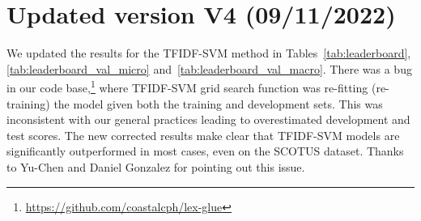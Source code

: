 \documentclass[11pt]{article}
\begin{document}
\section{Updated version V4 (09/11/2022)}

We updated the results for the TFIDF-SVM method in Tables~\ref{tab:leaderboard}, \ref{tab:leaderboard_val_micro} and~\ref{tab:leaderboard_val_macro}. There was a bug in our code base,\footnote{\url{https://github.com/coastalcph/lex-glue}} where TFIDF-SVM grid search function was re-fitting (re-training) the model given both the training and development sets. This was inconsistent with our general practices leading to overestimated development and test scores. The new corrected results make clear that TFIDF-SVM models are significantly outperformed in most cases, even on the SCOTUS dataset. Thanks to Yu-Chen and Daniel Gonzalez for pointing out this issue.
\end{document}
